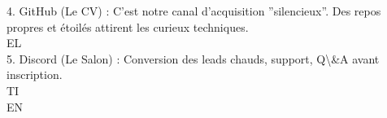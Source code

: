 \documentclass[12pt,landscape,a4paper]{article}
\begin{document}
4. GitHub (Le CV) : C’est notre canal d’acquisition ”silencieux”. Des repos propres et étoilés attirent les curieux techniques.\\
\vspace{0.5em}
\vspace{0.5em}
\vspace{0.5em}
\vspace{0.5em}
EL\\
5. Discord (Le Salon) : Conversion des leads chauds, support, Q\textbackslash{}&A avant inscription.\\
\vspace{0.5em}
\vspace{0.5em}
\vspace{0.5em}
\vspace{0.5em}
TI\\
EN\\
\end{document}
